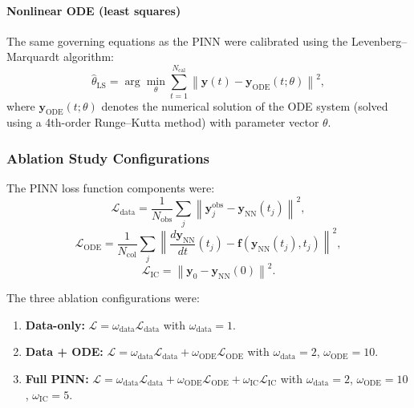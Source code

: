 \documentclass[12pt,a4paper]{article}
\begin{document}
	\paragraph{Nonlinear ODE (least squares)}
	The same governing equations as the PINN were calibrated using the Levenberg--Marquardt algorithm:
	\begin{equation}
		\hat{\theta}_{\mathrm{LS}} = \arg\min_{\theta} \sum_{t=1}^{N_{\mathrm{cal}}} \left\| \mathbf{y}(t) - \mathbf{y}_{\mathrm{ODE}}(t; \theta) \right\|^2,
	\end{equation}
	where $\mathbf{y}_{\mathrm{ODE}}(t; \theta)$ denotes the numerical solution of the ODE system (solved using a 4th-order Runge--Kutta method) with parameter vector $\theta$.
	
	\subsubsection{Ablation Study Configurations}
	
	The PINN loss function components were:
	\begin{equation}
		\mathcal{L}_{\mathrm{data}} = \frac{1}{N_{\mathrm{obs}}} \sum_{j} \left\| \mathbf{y}^{\mathrm{obs}}_j - \mathbf{y}_{\mathrm{NN}}(t_j) \right\|^2,
	\end{equation}
	\begin{equation}
		\mathcal{L}_{\mathrm{ODE}} = \frac{1}{N_{\mathrm{col}}} \sum_{j} \left\| \frac{d\mathbf{y}_{\mathrm{NN}}}{dt}(t_j) - \mathbf{f}(\mathbf{y}_{\mathrm{NN}}(t_j), t_j) \right\|^2,
	\end{equation}
	\begin{equation}
		\mathcal{L}_{\mathrm{IC}} = \left\| \mathbf{y}_0 - \mathbf{y}_{\mathrm{NN}}(0) \right\|^2.
	\end{equation}
	
	The three ablation configurations were:
	\begin{enumerate}
		\item \textbf{Data-only:} $\mathcal{L} = \omega_{\mathrm{data}} \mathcal{L}_{\mathrm{data}}$ with $\omega_{\mathrm{data}}=1$.
		\item \textbf{Data + ODE:} $\mathcal{L} = \omega_{\mathrm{data}} \mathcal{L}_{\mathrm{data}} + \omega_{\mathrm{ODE}} \mathcal{L}_{\mathrm{ODE}}$ with $\omega_{\mathrm{data}}=2$, $\omega_{\mathrm{ODE}}=10$.
		\item \textbf{Full PINN:} $\mathcal{L} = \omega_{\mathrm{data}} \mathcal{L}_{\mathrm{data}} + \omega_{\mathrm{ODE}} \mathcal{L}_{\mathrm{ODE}} + \omega_{\mathrm{IC}} \mathcal{L}_{\mathrm{IC}}$ with $\omega_{\mathrm{data}}=2$, $\omega_{\mathrm{ODE}}=10$, $\omega_{\mathrm{IC}}=5$.
	\end{enumerate}
	
\end{document}
